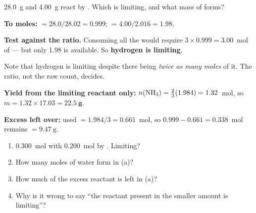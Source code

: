 \documentclass{apchem-worksheet}
\begin{document}
\begin{workedexample}
\SI{28.0}{\gram}  and \SI{4.00}{\gram}  react by
. Which is limiting, and what mass of 
forms?

\textbf{To moles:}  $= 28.0/28.02 = \num{0.999}$;
 $= 4.00/2.016 = \num{1.98}$.

\textbf{Test against the ratio.} Consuming all the  would require
$3 \times 0.999 = \num{3.00}$~mol of  --- but only \num{1.98} is
available. So \textbf{hydrogen is limiting}.

Note that hydrogen is limiting despite there being \emph{twice as many
moles} of it. The ratio, not the raw count, decides.

\textbf{Yield from the limiting reactant only:}
$n(\ce{NH3}) = \tfrac{2}{3}(1.984) = \num{1.32}$~mol,
so $m = 1.32 \times 17.03 = \mathbf{22.5~g}$.

\textbf{Excess left over:}  used $= 1.984/3 = \num{0.661}$~mol, so
$0.999 - 0.661 = \num{0.338}$~mol remains
$= \SI{9.47}{\gram}$.
\end{workedexample}

\begin{yourturn}
\begin{enumerate}[leftmargin=*,itemsep=0.5em]
  \item \SI{0.300}{\mole}  with \SI{0.200}{\mole}  by
        . Limiting? \workspace[1.6cm]
  \item How many moles of water form in (a)? \workspace[1.4cm]
  \item How much of the excess reactant is left in (a)?
        \workspace[1.6cm]
  \item Why is it wrong to say ``the reactant present in the smaller
        amount is limiting''? \workspace[1.8cm]
\end{enumerate}
\end{yourturn}
\end{document}

